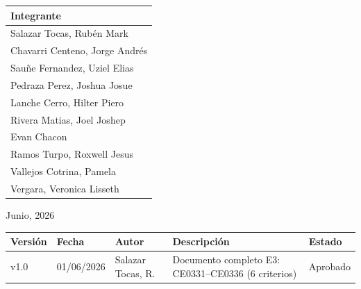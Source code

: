 \documentclass[11pt, a4paper, oneside]{report}
\begin{document}
\begin{titlepage}
  \begin{tabular}{@{}|l|@{}}
    \arrayrulecolor{upeu_dark}
    \rowcolor{upeu_dark}
    {\color{white}\bfseries\small Integrante} \\ \hline
    {\color{body_gray}\small Salazar Tocas, Rubén Mark} \\ \hline
    {\color{body_gray}\small Chavarri Centeno, Jorge Andrés} \\ \hline
    {\color{body_gray}\small Sauñe Fernandez, Uziel Elias} \\ \hline
    {\color{body_gray}\small Pedraza Perez, Joshua Josue} \\ \hline
    {\color{body_gray}\small Lanche Cerro, Hilter Piero} \\ \hline
    {\color{body_gray}\small Rivera Matias, Joel Joshep} \\ \hline
    {\color{body_gray}\small Evan Chacon} \\ \hline
    {\color{body_gray}\small Ramos Turpo, Roxwell Jesus} \\ \hline
    {\color{body_gray}\small Vallejos Cotrina, Pamela} \\ \hline
    {\color{body_gray}\small Vergara, Veronica Lisseth} \\ \hline
  \end{tabular}

  \vspace{0.6cm}
  {\color{body_gray} Junio, 2026}

  \vspace*{\fill}
\end{titlepage}

\newpage
\thispagestyle{empty}
\vspace{2cm}

{\centering
\begin{tabular}{@{}|C{1.5cm}|C{2.2cm}|L{3cm}|L{5cm}|C{2cm}|@{}}
  {\color{white}\bfseries\small Versión} &
  {\color{white}\bfseries\small Fecha} &
  {\color{white}\bfseries\small Autor} &
  {\color{white}\bfseries\small Descripción} &
  {\color{white}\bfseries\small Estado} \\ \hline
  \small v1.0 & \small 01/06/2026 & \small Salazar Tocas, R. & \small Documento completo E3: CE0331--CE0336 (6 criterios) & \small Aprobado \\ \hline
\end{tabular}
\par}
\end{document}
